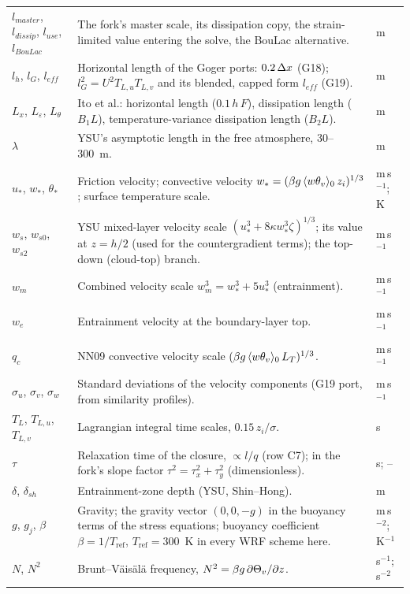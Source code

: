 \begin{xltabular}{\linewidth}{@{}>{\raggedright\arraybackslash}p{3.6cm} >{\raggedright\arraybackslash}X >{\raggedright\arraybackslash}p{2.3cm}@{}}
$l_{master}$, $l_{dissip}$, $l_{use}$, $l_{BouLac}$ & The fork's master scale, its dissipation copy, the strain-limited value entering the solve, the BouLac alternative. & m \\
$l_h$, $l_G$, $l_{eff}$ & Horizontal length of the Goger ports: $0.2\,\Delta x$ (G18); $l_G^2 = U^2 T_{L,u}T_{L,v}$ and its blended, capped form $l_{eff}$ (G19). & m \\
$L_x$, $L_\varepsilon$, $L_\theta$ & Ito et al.: horizontal length ($0.1\,h\,F$), dissipation length ($B_1 L$), temperature-variance dissipation length ($B_2 L$). & m \\
$\lambda$ & YSU's asymptotic length in the free atmosphere, 30--300~m. & m \\
$u_*$, $w_*$, $\theta_*$ & Friction velocity; convective velocity $w_* = (\beta g\,\langle w\theta_v \rangle_0\, z_i)^{1/3}$; surface temperature scale. & m\,s$^{-1}$; K \\
$w_s$, $w_{s0}$, $w_{s2}$ & YSU mixed-layer velocity scale $(u_*^3 + 8\kappa w_*^3\zeta)^{1/3}$; its value at $z = h/2$ (used for the countergradient terms); the top-down (cloud-top) branch. & m\,s$^{-1}$ \\
$w_m$ & Combined velocity scale $w_m^3 = w_*^3 + 5u_*^3$ (entrainment). & m\,s$^{-1}$ \\
$w_e$ & Entrainment velocity at the boundary-layer top. & m\,s$^{-1}$ \\
$q_c$ & NN09 convective velocity scale $(\beta g\,\langle w\theta_v \rangle_0\, L_T)^{1/3}$. & m\,s$^{-1}$ \\
$\sigma_u$, $\sigma_v$, $\sigma_w$ & Standard deviations of the velocity components (G19 port, from similarity profiles). & m\,s$^{-1}$ \\
$T_L$, $T_{L,u}$, $T_{L,v}$ & Lagrangian integral time scales, $0.15\,z_i/\sigma$. & s \\
$\tau$ & Relaxation time of the closure, $\propto l/q$ (row C7); in the fork's slope factor $\tau^2 = \tau_x^2 + \tau_y^2$ (dimensionless). & s; -- \\
$\delta$, $\delta_{sh}$ & Entrainment-zone depth (YSU, Shin--Hong). & m \\
$g$, $g_j$, $\beta$ & Gravity; the gravity vector $(0, 0, -g)$ in the buoyancy terms of the stress equations; buoyancy coefficient $\beta = 1/T_{\mathrm{ref}}$, $T_{\mathrm{ref}} = 300$~K in every WRF scheme here. & m\,s$^{-2}$; K$^{-1}$ \\
$N$, $N^2$ & Brunt--V\"ais\"al\"a frequency, $N^2 = \beta g\,\partial \Theta_v/\partial z$. & s$^{-1}$; s$^{-2}$ \\

\end{xltabular}
